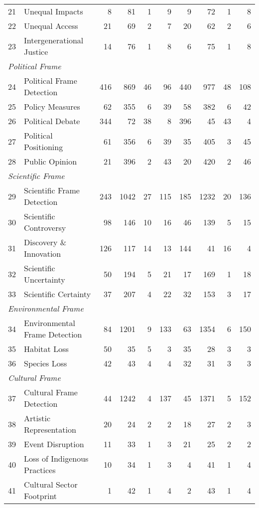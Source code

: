 \documentclass[12pt]{article}
\begin{document}
{\begin{longtable}{p{0.5cm}p{5.5cm}rrrrrrrr}
21 & Unequal Impacts & 8 & 81 & 1 & 9 & 9 & 72 & 1 & 8 \\
22 & Unequal Access & 21 & 69 & 2 & 7 & 20 & 62 & 2 & 6 \\
23 & Intergenerational Justice & 14 & 76 & 1 & 8 & 6 & 75 & 1 & 8 \\
\multicolumn{10}{l}{\textit{Political Frame}} \\
24 & Political Frame Detection & 416 & 869 & 46 & 96 & 440 & 977 & 48 & 108 \\
25 & Policy Measures & 62 & 355 & 6 & 39 & 58 & 382 & 6 & 42 \\
26 & Political Debate & 344 & 72 & 38 & 8 & 396 & 45 & 43 & 4 \\
27 & Political Positioning & 61 & 356 & 6 & 39 & 35 & 405 & 3 & 45 \\
28 & Public Opinion & 21 & 396 & 2 & 43 & 20 & 420 & 2 & 46 \\
\multicolumn{10}{l}{\textit{Scientific Frame}} \\
29 & Scientific Frame Detection & 243 & 1042 & 27 & 115 & 185 & 1232 & 20 & 136 \\
30 & Scientific Controversy & 98 & 146 & 10 & 16 & 46 & 139 & 5 & 15 \\
31 & Discovery \& Innovation & 126 & 117 & 14 & 13 & 144 & 41 & 16 & 4 \\
32 & Scientific Uncertainty & 50 & 194 & 5 & 21 & 17 & 169 & 1 & 18 \\
33 & Scientific Certainty & 37 & 207 & 4 & 22 & 32 & 153 & 3 & 17 \\
\multicolumn{10}{l}{\textit{Environmental Frame}} \\
34 & Environmental Frame Detection & 84 & 1201 & 9 & 133 & 63 & 1354 & 6 & 150 \\
35 & Habitat Loss & 50 & 35 & 5 & 3 & 35 & 28 & 3 & 3 \\
36 & Species Loss & 42 & 43 & 4 & 4 & 32 & 31 & 3 & 3 \\
\multicolumn{10}{l}{\textit{Cultural Frame}} \\
37 & Cultural Frame Detection & 44 & 1242 & 4 & 137 & 45 & 1371 & 5 & 152 \\
38 & Artistic Representation & 20 & 24 & 2 & 2 & 18 & 27 & 2 & 3 \\
39 & Event Disruption & 11 & 33 & 1 & 3 & 21 & 25 & 2 & 2 \\
40 & Loss of Indigenous Practices & 10 & 34 & 1 & 3 & 4 & 41 & 1 & 4 \\
41 & Cultural Sector Footprint & 1 & 42 & 1 & 4 & 2 & 43 & 1 & 4 \\

\end{longtable}}
\end{document}
